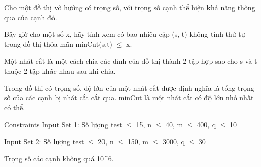 Cho một đồ thị vô hướng có trọng số, với trọng số cạnh thể hiện khả năng thông qua của cạnh đó.  

   Bây giờ cho một số x, hãy tính xem có bao nhiêu cặp (s, t) không tính thứ tự trong đồ thị thỏa mãn minCut(s,t)  $\le$  x.  

   Một nhát cắt là một cách chia các đỉnh của đồ thị thành 2 tập hợp sao cho s và t thuộc 2 tập khác nhau sau khi chia.  

   Trong đồ thị có trọng số, độ lớn của một nhát cắt được định nghĩa là tổng trọng số của các cạnh bị nhát cắt cắt qua. minCut là một nhát cắt có độ lớn nhỏ nhất có thể.  

Constraints
Input Set 1: Số lượng test  $\le$  15, n  $\le$  40, m  $\le$  400, q  $\le$  10  

   Input Set 2: Số lượng test  $\le$  20, n  $\le$  150, m  $\le$  3000, q  $\le$  30  

   Trọng số các cạnh không quá 10^6.